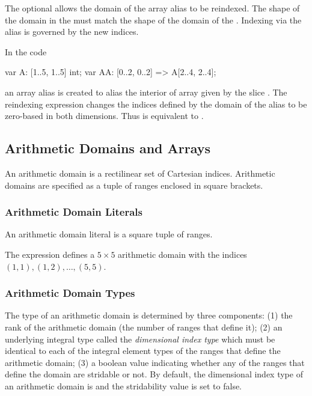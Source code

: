 The optional  allows the domain of the
array alias to be reindexed.  The shape of the domain in
the  must match the shape of the domain of
the .  Indexing via the alias is governed by
the new indices.

\begin{example}
In the code
\begin{chapel}
var A: [1..5, 1..5] int;
var AA: [0..2, 0..2] => A[2..4, 2..4];
\end{chapel}
an array alias  is created to alias the interior of
array  given by the slice .  The
reindexing expression changes the indices defined by the domain of the
alias to be zero-based in both dimensions.  Thus  is
equivalent to .
\end{example}

\subsection{Arithmetic Domains and Arrays}
\label{Arithmetic_Domains_and_Arrays}

An arithmetic domain is a rectilinear set of Cartesian indices.
Arithmetic domains are specified as a tuple of ranges enclosed in
square brackets.

\subsubsection{Arithmetic Domain Literals}
\label{Arithmetic_Domain_Literals}

An arithmetic domain literal is a square tuple of ranges.
\begin{example}
The expression \chpl{[1..5, 1..5]} defines a $5 \times 5$ arithmetic
domain with the indices $(1, 1), (1, 2), \ldots, (5, 5)$.
\end{example}

\subsubsection{Arithmetic Domain Types}
\label{Arithmetic_Domain_Types}

The type of an arithmetic domain is determined by three components:
(1) the rank of the arithmetic domain (the number of ranges that
define it); (2) an underlying integral type called the
\emph{dimensional index type} which must be identical to each of the
integral element types of the ranges that define the arithmetic
domain; (3) a boolean value indicating whether any of the ranges that
define the domain are stridable or not.  By default, the dimensional
index type of an arithmetic domain is  and the stridability
value is set to false.

